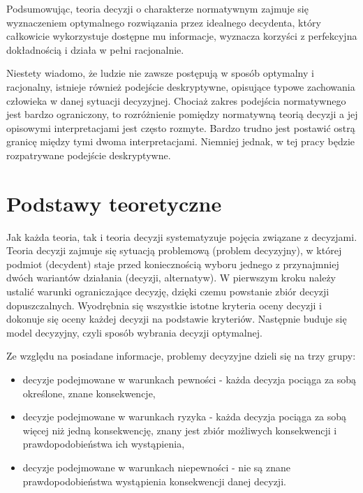 Podsumowując, teoria decyzji o charakterze normatywnym zajmuje się wyznaczeniem 
optymalnego rozwiązania przez idealnego decydenta, który całkowicie wykorzystuje
dostępne mu informacje, wyznacza korzyści z perfekcyjna dokładnością i działa w 
pełni racjonalnie.

Niestety wiadomo, że ludzie nie zawsze postępują w sposób optymalny i
racjonalny,  istnieje również podejście deskryptywne, opisujące typowe 
zachowania człowieka w danej sytuacji decyzyjnej. Chociaż zakres podejścia 
normatywnego jest bardzo ograniczony, to rozróżnienie pomiędzy normatywną 
teorią decyzji a jej opisowymi interpretacjami jest często rozmyte. Bardzo 
trudno jest postawić ostrą granicę między tymi dwoma interpretacjami. Niemniej 
jednak, w tej pracy będzie rozpatrywane podejście deskryptywne.

\section{Podstawy teoretyczne}
Jak każda teoria, tak i teoria decyzji systematyzuje pojęcia związane z 
decyzjami. Teoria decyzji zajmuje się sytuacją problemową (problem decyzyjny), 
w której podmiot (decydent) staje przed koniecznością wyboru jednego z 
przynajmniej dwóch wariantów działania (decyzji, alternatyw). W pierwszym kroku 
należy ustalić warunki ograniczające decyzję, dzięki czemu powstanie zbiór 
decyzji dopuszczalnych. Wyodrębnia się wszystkie istotne kryteria oceny decyzji 
i dokonuje się oceny każdej decyzji na podstawie kryteriów. Następnie buduje 
się model decyzyjny, czyli sposób wybrania decyzji optymalnej.

Ze względu na posiadane informacje, problemy decyzyjne dzieli się na trzy grupy:
\begin{itemize}
  \item decyzje podejmowane w warunkach pewności - każda decyzja pociąga za 
  sobą określone, znane konsekwencje,
  
  \item decyzje podejmowane w warunkach ryzyka - każda decyzja pociąga za sobą 
  więcej niż jedną konsekwencję, znany jest zbiór możliwych konsekwencji i
  prawdopodobieństwa ich wystąpienia, 
  
  \item decyzje podejmowane w warunkach niepewności - nie są znane 
  prawdopodobieństwa wystąpienia konsekwencji danej decyzji.

\end{itemize}

